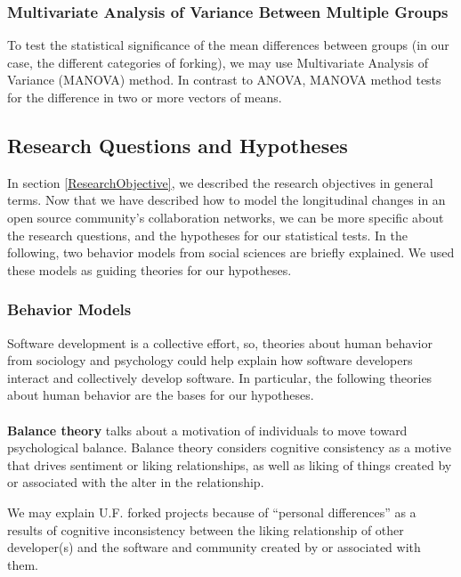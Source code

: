 \documentclass[11pt]{report}
\begin{document}
\subsubsection{Multivariate Analysis of Variance Between Multiple Groups}
\label{MANOVA}
To test the statistical significance of the mean differences between groups (in our case, the different categories of forking), we may use Multivariate Analysis of Variance (MANOVA) method. In contrast to ANOVA, MANOVA method tests for the difference in two or more vectors of means. 

\subsection{Research Questions and Hypotheses}
\label{RQs}
In section \ref{ResearchObjective}, we described the research objectives in general terms. Now that we have described how to model the longitudinal changes in an open source community's collaboration networks, we can be more specific about the research questions, and the hypotheses for our statistical tests. In the following, two behavior models from social sciences are briefly explained. We used these models as guiding theories for our hypotheses.

\subsubsection{Behavior Models}
Software development is a collective effort, so, theories about human behavior from sociology and psychology could help explain how software developers interact and collectively develop software. In particular, the following theories about human behavior are the bases for our hypotheses. 

\paragraph{} \textbf{Balance theory} \cite{Heider} talks about a motivation of individuals to move toward psychological balance. Balance theory considers cognitive consistency as a motive that drives sentiment or liking relationships, as well as liking of things created by or associated with the alter in the relationship.

We may explain U.F. forked projects because of ``personal differences'' as a results of cognitive inconsistency between the liking relationship of other developer(s) and the software and community created by or associated with them. 
\end{document}
